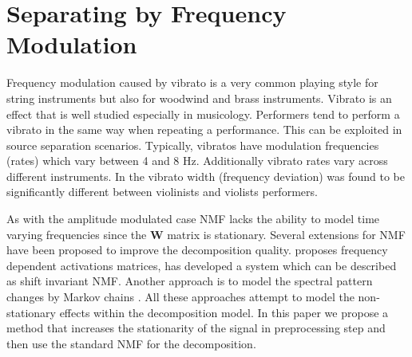 

\section{Separating by Frequency Modulation}
\label{sub:frequency_modulation}


Frequency modulation caused by vibrato is a very common playing style for string instruments but also for woodwind and brass instruments. Vibrato is an effect that is well studied especially in musicology. Performers tend to perform a vibrato in the same way when repeating a performance. This can be exploited in source separation scenarios. Typically, vibratos have modulation frequencies (rates) which vary between 4 and 8 Hz. Additionally vibrato rates vary across different instruments. In \cite{macleod06} the vibrato width (frequency deviation) was found to be significantly different between violinists and violists performers.


As with the amplitude modulated case NMF lacks the ability to model time varying frequencies since the $\mathbf{W}$ matrix is stationary. Several extensions for NMF have been proposed to improve the decomposition quality. \cite{hennequin11} proposes frequency dependent activations matrices, \cite{smaragdis08} has developed a system which can be described as shift invariant NMF. Another approach is to model the spectral pattern changes by Markov chains \cite{nakano10}. All these approaches attempt to model the non-stationary effects within the decomposition model. In this paper we propose a method that increases the stationarity of the signal in preprocessing step and then use the standard NMF for the decomposition. \\


